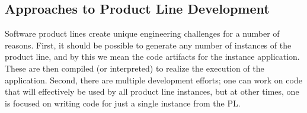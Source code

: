 





\subsection{Approaches to Product Line Development}

Software product lines create unique engineering challenges for a number
of reasons. First, it should be possible to generate any number of
instances of the product line, and by this we mean the code artifacts
for the instance application. These are then compiled (or interpreted)
to realize the execution of the application. Second, there are multiple
development efforts; one can work on code that will effectively be used
by all product line instances, but at other times, one is focused on
writing code for just a single instance from the PL.

